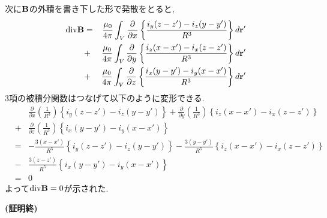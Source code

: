 \documentclass{jsarticle}
\begin{document}
次に${\bf B}$の外積を書き下した形で発散をとると,
\begin{eqnarray*}
{\rm div}{\bf B}&=&\frac{\mu_0}{4 \pi}  \int_{V}^{} \frac{\partial}{\partial x}\left\{ \frac{i_y(z-z')-i_z(y-y')}{R^3} \right\} d{\bf r'} \\
&+&\frac{\mu_0}{4 \pi}  \int_{V}^{} \frac{\partial}{\partial y} \left\{ \frac{i_z(x-x')-i_x(z-z')}{R^3} \right\} d{\bf r'} \\
&+&\frac{\mu_0}{4 \pi}  \int_{V}^{} \frac{\partial}{\partial z} \left\{ \frac{i_x(y-y')-i_y(x-x')}{R^3} \right\} d{\bf r'} \\
\end{eqnarray*}
3項の被積分関数はつなげて以下のように変形できる. \\
\begin{eqnarray*}
&\ & \frac{\partial}{\partial x}\left( \frac{1}{R^3} \right) \left\{i_y(z-z')-i_z(y-y')\right\} + \frac{\partial}{\partial y}\left( \frac{1}{R^3} \right) \left\{i_z(x-x')-i_x(z-z')\right\} \\
&+& \frac{\partial}{\partial z}\left( \frac{1}{R^3} \right) \left\{i_x(y-y')-i_y(x-x')\right\} \\
&=&-\frac{3(x-x')}{R^5} \left\{i_y(z-z')-i_z(y-y')\right\} - \frac{3(y-y')}{R^5} \left\{i_z(x-x')-i_x(z-z')\right\} \\
&-& \frac{3(z-z')}{R^5} \left\{i_x(y-y')-i_y(x-x')\right\} \\
&=& 0
\end{eqnarray*}
よって${\rm div}{\bf B}=0$が示された. \\
\begin{flushright}
{\bf (証明終)}
\end{flushright}
\end{document}
